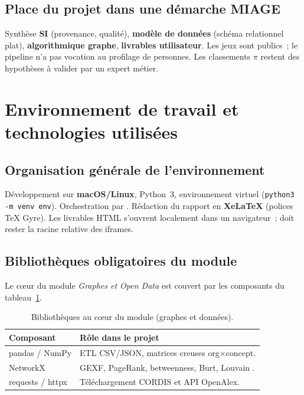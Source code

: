 \documentclass[12pt,a4paper,oneside]{article}
\begin{document}
\subsection{Place du projet dans une démarche MIAGE}
Synthèse \textbf{SI} (provenance, qualité), \textbf{modèle de données} (schéma relationnel plat), \textbf{algorithmique graphe}, \textbf{livrables utilisateur}. Les jeux sont publics~; le pipeline n'a pas vocation au profilage de personnes. Les classements $\pi$ restent des hypothèses à valider par un expert métier.

\section{Environnement de travail et technologies utilisées}

\subsection{Organisation générale de l'environnement}
Développement sur \textbf{macOS/Linux}, Python~3, environnement virtuel (\texttt{python3 -m venv env}). Orchestration par . Rédaction du rapport en \textbf{XeLaTeX} (polices TeX Gyre). Les livrables HTML s'ouvrent localement dans un navigateur~;  doit rester la racine relative des iframes.

\subsection{Bibliothèques obligatoires du module}
Le cœur du module \emph{Graphes et Open Data} est couvert par les composants du tableau~\ref{tab:libs-core}.

\begin{table}[htbp]
\centering
\small
\caption{Bibliothèques au cœur du module (graphes et données).}
\label{tab:libs-core}
\begin{tabularx}{\textwidth}{@{}p{2.6cm} X@{}}
\toprule
\textbf{Composant} & \textbf{Rôle dans le projet} \\
\midrule
pandas / NumPy & ETL CSV/JSON, matrices creuses org$\times$concept. \\
NetworkX & GEXF, PageRank, betweenness, Burt, Louvain \cite{hagberg2008,blondel2008}. \\
requests / httpx & Téléchargement CORDIS et API OpenAlex. \\
\bottomrule
\end{tabularx}
\end{table}
\end{document}

